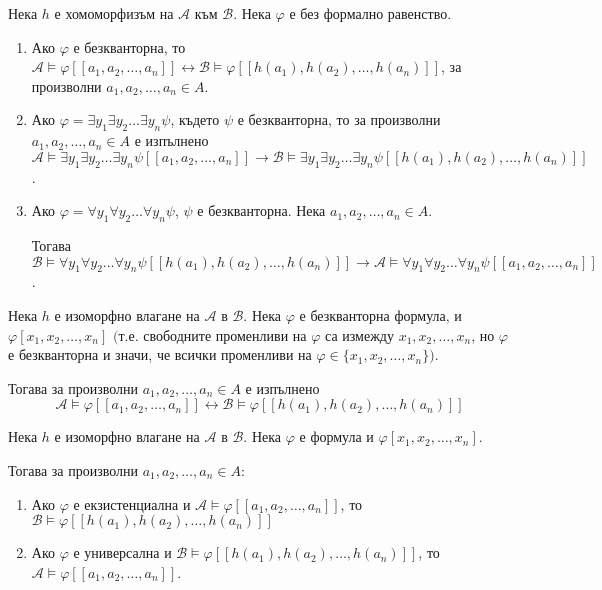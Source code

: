 \documentclass{article}
\begin{document}
\begin{claim}
Нека $h$ е хомоморфизъм на $\mathcal{A}$ към $\mathcal{B}$. Нека $\varphi$ е без формално равенство.
\begin{enumerate}
\item Ако $\varphi$ е безкванторна, то $\mathcal{A} \models \varphi[\![a_1, a_2, \ldots, a_n]\!] \longleftrightarrow \mathcal{B} \models \varphi[\![h(a_1), h(a_2), \ldots, h(a_n)]\!]$, за произволни $a_1, a_2, \ldots, a_n \in A$.
\item Ако $\varphi = \exists y_1\exists y_2\ldots\exists y_n\psi$, където $\psi$ е безкванторна, то за произволни $a_1, a_2, \ldots, a_n \in A$ е изпълнено $\mathcal{A} \models \exists y_1\exists y_2\ldots\exists y_n\psi[\![a_1, a_2, \ldots, a_n]\!] \longrightarrow \mathcal{B} \models \exists y_1\exists y_2\ldots\exists y_n\psi[\![h(a_1), h(a_2), \ldots, h(a_n)]\!]$.
\item Ако $\varphi = \forall y_1\forall y_2\ldots\forall y_n\psi$, $\psi$ е безкванторна. Нека $a_1, a_2, \ldots, a_n \in A$. 

Тогава $\mathcal{B} \models \forall y_1\forall y_2\ldots\forall y_n\psi[\![h(a_1), h(a_2), \ldots, h(a_n)]\!] \longrightarrow \mathcal{A} \models \forall y_1\forall y_2\ldots\forall y_n\psi[\![a_1, a_2, \ldots, a_n]\!]$.

\end{enumerate}
\end{claim}

\begin{claim}
Нека $h$ е изоморфно влагане на $\mathcal{A}$ в $\mathcal{B}$. Нека $\varphi$ е безкванторна формула, и $\varphi[x_1, x_2, \ldots, x_n]$ $($т.е. свободните променливи на $\varphi$ са измежду $x_1, x_2, \ldots, x_n$, но $\varphi$ е безкванторна и значи, че всички променливи на $\varphi \in \{x_1, x_2, \ldots, x_n\})$.

Тогава за произволни $a_1, a_2, \ldots, a_n \in A$ е изпълнено \[\mathcal{A} \models \varphi [\![a_1, a_2, \ldots, a_n]\!] \longleftrightarrow \mathcal{B} \models \varphi [\![h(a_1), h(a_2), \ldots, h(a_n)]\!]\]

\setcounter{conseq}{0}

\begin{conseq}
Нека $h$ е изоморфно влагане на $\mathcal{A}$ в $\mathcal{B}$. Нека $\varphi$ е формула и $\varphi[x_1, x_2, \ldots, x_n]$.

Тогава за произволни $a_1, a_2, \ldots, a_n \in A$:
\begin{enumerate}
\item Ако $\varphi$ е екзистенциална и $\mathcal{A} \models \varphi[\![a_1, a_2, \ldots, a_n]\!]$, то $\mathcal{B} \models \varphi[\![h(a_1), h(a_2), \ldots, h(a_n)]\!]$

\item Ако $\varphi$ е универсална и $\mathcal{B} \models \varphi[\![h(a_1), h(a_2), \ldots, h(a_n)]\!]$, то $\mathcal{A} \models \varphi[\![a_1, a_2, \ldots, a_n]\!]$.
\end{enumerate}

\end{conseq}

\end{claim}
\end{document}
